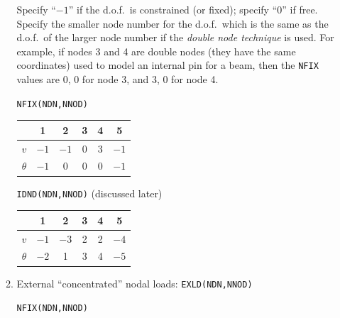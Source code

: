 \begin{enumerate}[leftmargin=*]
\begin{enumerate}[label=(\alph*)]
        Specify ``$-1$'' if the d.o.f.\ is constrained (or fixed); specify ``0'' if free. Specify the smaller node number for the d.o.f.\ which is the same as the d.o.f.\ of the larger node number if the \emph{double node technique} is used. For example, if nodes 3 and 4 are double nodes (they have the same coordinates) used to model an internal pin for a beam, then the \texttt{NFIX} values are 0, 0 for node 3, and 3, 0 for node 4.
        \begin{fig}
          
        \end{fig}
        \begin{center}
          \begin{minipage}{0.47\linewidth}\centering
            \texttt{NFIX(NDN,NNOD)}\\[4pt]
            \begin{tabular}{|c|c|c|c|c|c|}\hline
                       & 1    & 2    & 3 & 4 & 5   \\\hline
              $v$      & $-1$ & $-1$ & 0 & 3 & $-1$\\\hline
              $\theta$ & $-1$ & 0    & 0 & 0 & $-1$\\\hline
            \end{tabular}
          \end{minipage}
          \begin{minipage}{0.5\linewidth}\centering
            \texttt{IDND(NDN,NNOD)} (discussed later)\\[4pt]
            \begin{tabular}{|c|c|c|c|c|c|}\hline
                       & 1    & 2    & 3 & 4 & 5   \\\hline
              $v$      & $-1$ & $-3$ & 2 & 2 & $-4$\\\hline
              $\theta$ & $-2$ & 1    & 3 & 4 & $-5$\\\hline
            \end{tabular}
          \end{minipage}
        \end{center}
      \item External ``concentrated'' nodal loads: \texttt{EXLD(NDN,NNOD)}
        \begin{fig}
          
        \end{fig}
        \begin{center}
          \begin{minipage}{0.47\linewidth}\centering
            \texttt{NFIX(NDN,NNOD)}\\[4pt]

\end{minipage}
\end{center}
\end{enumerate}
\end{enumerate}
